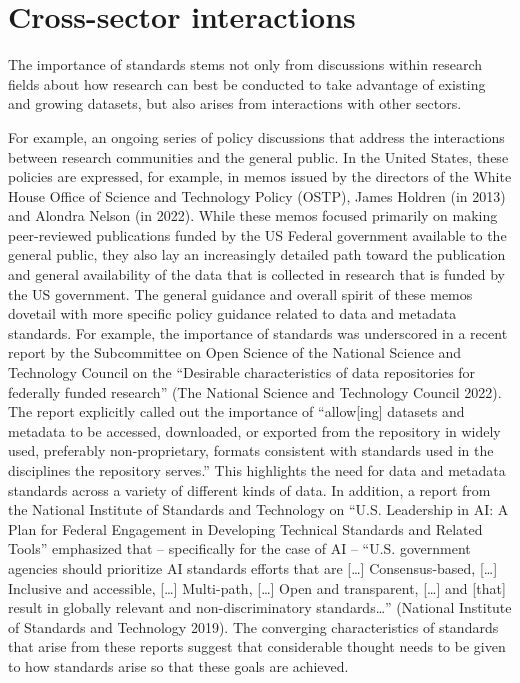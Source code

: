 \documentclass[
  letterpaper,
  DIV=11,
  numbers=noendperiod]{scrartcl}
\begin{document}
\section{Cross-sector interactions}\label{cross-sector-interactions}

The importance of standards stems not only from discussions within
research fields about how research can best be conducted to take
advantage of existing and growing datasets, but also arises from
interactions with other sectors.

For example, an ongoing series of policy discussions that address the
interactions between research communities and the general public. In the
United States, these policies are expressed, for example, in memos
issued by the directors of the White House Office of Science and
Technology Policy (OSTP), James Holdren (in 2013) and Alondra Nelson (in
2022). While these memos focused primarily on making peer-reviewed
publications funded by the US Federal government available to the
general public, they also lay an increasingly detailed path toward the
publication and general availability of the data that is collected in
research that is funded by the US government. The general guidance and
overall spirit of these memos dovetail with more specific policy
guidance related to data and metadata standards. For example, the
importance of standards was underscored in a recent report by the
Subcommittee on Open Science of the National Science and Technology
Council on the ``Desirable characteristics of data repositories for
federally funded research'' (The National Science and Technology Council
2022). The report explicitly called out the importance of
``allow{[}ing{]} datasets and metadata to be accessed, downloaded, or
exported from the repository in widely used, preferably non-proprietary,
formats consistent with standards used in the disciplines the repository
serves.'' This highlights the need for data and metadata standards
across a variety of different kinds of data. In addition, a report from
the National Institute of Standards and Technology on ``U.S. Leadership
in AI: A Plan for Federal Engagement in Developing Technical Standards
and Related Tools'' emphasized that -- specifically for the case of AI
-- ``U.S. government agencies should prioritize AI standards efforts
that are {[}\ldots{]} Consensus-based, {[}\ldots{]} Inclusive and
accessible, {[}\ldots{]} Multi-path, {[}\ldots{]} Open and transparent,
{[}\ldots{]} and {[}that{]} result in globally relevant and
non-discriminatory standards\ldots{}'' (National Institute of Standards
and Technology 2019). The converging characteristics of standards that
arise from these reports suggest that considerable thought needs to be
given to how standards arise so that these goals are achieved.
\end{document}
